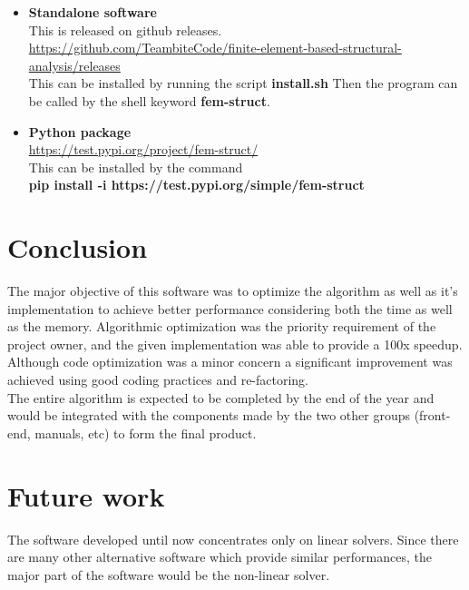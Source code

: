 \documentclass[12pt]{article}
\begin{document}
\begin{itemize}
    \item \textbf{Standalone software}\\
    This is released on github releases.\\
    \href{https://github.com/TeambiteCode/finite-element-based-structural-analysis/releases}{https://github.com/TeambiteCode/finite-element-based-structural-analysis/releases}\\
    This can be installed by running the script \textbf{install.sh}
    Then the program can be called by the shell keyword \textbf{fem-struct}.
    \item \textbf{Python package}\\
    \href{https://test.pypi.org/project/fem-struct/}{https://test.pypi.org/project/fem-struct/}\\
    This can be installed by the command\\
    \textbf{pip install -i https://test.pypi.org/simple/fem-struct}\\
    
    
    
    
\end{itemize}

\section{Conclusion}
The major objective of this software was to optimize the algorithm as well as  it's implementation to achieve better performance considering both the time as well as the memory. Algorithmic optimization was the priority requirement of the project owner, and the given implementation was able to provide a 100x speedup.
Although code optimization was a minor concern a significant improvement was achieved using good coding practices and re-factoring.\\

The entire algorithm is expected to be completed by the end of the year and would be integrated with the components made by the two other groups (front-end, manuals, etc) to form the final product.

\section{Future work}
The software developed until now concentrates only on linear solvers. Since there are many other alternative software which provide similar performances, the major part of the software would be the non-linear solver.\\
\end{document}
